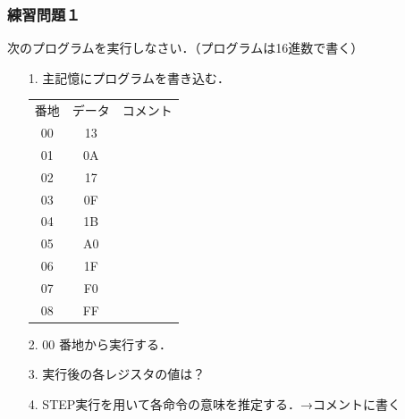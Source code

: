 \documentclass{beamer}                 %
\begin{document}
\begin{frame}
  \frametitle{練習問題１}
  次のプログラムを実行しなさい．（プログラムは16進数で書く）
  \begin{enumerate}
    \item[1.] 主記憶にプログラムを書き込む．\\
      \begin{tabular}{c c l}
        番地 & データ & コメント \\
        00   & 13     &          \\
        01   & 0A     &          \\
        02   & 17     &          \\
        03   & 0F     &          \\
        04   & 1B     &          \\
        05   & A0     &          \\
        06   & 1F     &          \\
        07   & F0     &          \\
        08   & FF     &          \\
      \end{tabular}
    \item[2.] 00 番地から実行する．
    \item[3.] 実行後の各レジスタの値は？
    \item[4.] STEP実行を用いて各命令の意味を推定する．→コメントに書く
  \end{enumerate}
\end{frame}
\end{document}
